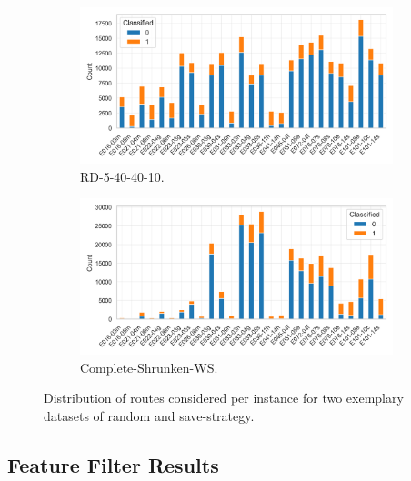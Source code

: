 \begin{figure}[ht]
	\centering
	\begin{subfigure}[t]{.5\textwidth}
		\centering
		\includegraphics[width=\linewidth]{pictures/dataset_structure/distribution_plot_RandomData_5_40_40_10.png}
		\caption{RD-5-40-40-10.}
	\end{subfigure}%
	\begin{subfigure}[t]{.5\textwidth}
		\centering
		\includegraphics[width=\linewidth]{pictures/dataset_structure/distribution_plot_gendreau_28880_600_WS_shrinked094.png}
		\caption{Complete-Shrunken-WS.}
	\end{subfigure}
	\caption[Distribution of routes considered per instance for two exemplary datasets of random and save-strategy.]
	{Distribution of routes considered per instance for two exemplary datasets of random and save-strategy.}
	\label{fig:comparison_noroutes_perInstancce}
\end{figure}

\subsection{Feature Filter Results}
\label{sec:feature_filter_results}

